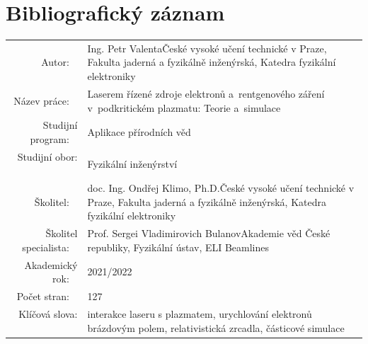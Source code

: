 \documentclass[10pt, a4paper, twoside, openright]{report}
\newcommand{\projecttitlecz}{Laserem řízené zdroje elektronů a~rentgenového záření v~podkritickém plazmatu: Teorie a~simulace}
\newcommand{\valenta}{Ing. Petr Valenta}
\newcommand{\klimo}{doc. Ing. Ondřej Klimo, Ph.D.}
\newcommand{\bulanov}{Prof. Sergei Vladimirovich Bulanov}
\begin{document}



\chapter*{Bibliografický záznam}
\thispagestyle{empty}
\begin{flushleft}
	\renewcommand{\arraystretch}{1.5}
	\begin{tabular}{r p{10cm}}
		Autor:
		~ & \valenta \newline České vysoké učení technické v Praze, Fakulta jaderná a fyzikálně inženýrská, Katedra fyzikální elektroniky \\
		Název práce:
		~ & \projecttitlecz \\
		Studijní program:
		~ & Aplikace přírodních věd \\
		Studijní obor:
		~ & Fyzikální inženýrství \\
		Školitel:
		~ & \klimo \newline České vysoké učení technické v Praze, Fakulta jaderná a fyzikálně inženýrská, Katedra fyzikální elektroniky \\
		Školitel specialista:
		~ & \bulanov \newline Akademie věd České republiky, Fyzikální ústav, ELI Beamlines \\
		Akademický rok:
		~ & 2021/2022 \\
		Počet stran:
		~ & 127 \\
		Klíčová slova:
		~ & interakce laseru s plazmatem, urychlování elektronů brázdovým polem, relativistická zrcadla, částicové simulace \\
	\end{tabular}
\end{flushleft}

\end{document}
